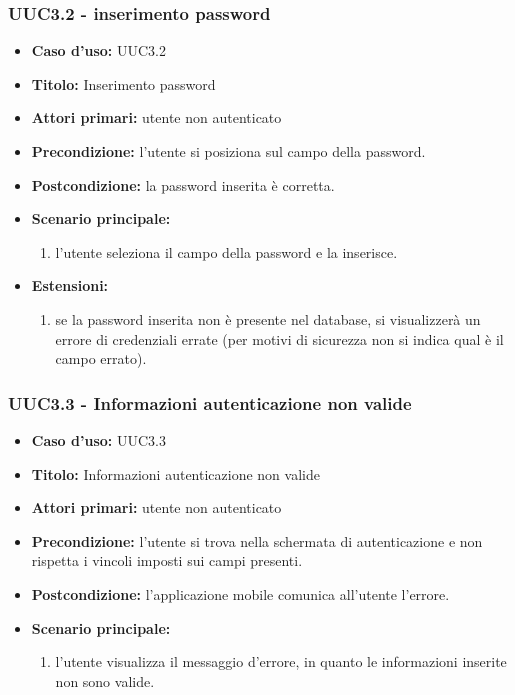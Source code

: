 \documentclass[casi-duso]{subfiles}
\begin{document}
\subsubsection{UUC3.2 - inserimento password}
\label{subsub:UUC3.2utente}
\begin{itemize}
  \item \textbf{Caso d’uso:} UUC3.2 
  \item \textbf{Titolo:} Inserimento password
  \item \textbf{Attori primari:} utente non autenticato
  \item \textbf{Precondizione:} l'utente si posiziona sul campo della password.
  \item \textbf{Postcondizione:} la password inserita è corretta.
  \item \textbf{Scenario principale:} 
  \begin{enumerate}
    \item l'utente seleziona il campo della password e la inserisce.
  \end{enumerate}  
  \item \textbf{Estensioni:} 
  \begin{enumerate}
    \item se la password inserita non è presente nel database, si visualizzerà un errore di credenziali errate (per motivi di sicurezza
    non si indica qual è il campo errato).
  \end{enumerate}  
\end{itemize}

\subsubsection{UUC3.3 - Informazioni autenticazione non valide}
\label{subsub:UUC3.3utente}
\begin{itemize}
  \item \textbf{Caso d’uso:} UUC3.3 
  \item \textbf{Titolo:} Informazioni autenticazione non valide
  \item \textbf{Attori primari:} utente non autenticato
  \item \textbf{Precondizione:} l'utente si trova nella schermata di autenticazione e non rispetta i vincoli imposti sui campi presenti.
  \item \textbf{Postcondizione:} l'applicazione mobile comunica all'utente l'errore.
  \item \textbf{Scenario principale:} 
  \begin{enumerate}
    \item l'utente visualizza il messaggio d'errore, in quanto le informazioni inserite non sono valide.
  \end{enumerate}  
\end{itemize}
\end{document}
